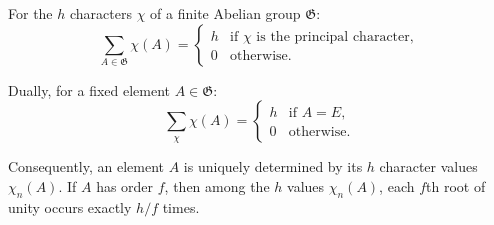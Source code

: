 For the $h$ characters $\chi$ of a finite Abelian group $\mathfrak{G}$:
$$\sum_{A \in \mathfrak{G}} \chi(A) = \begin{cases} h & \text{if } \chi \text{ is the principal character}, \\ 0 & \text{otherwise}. \end{cases}$$

Dually, for a fixed element $A \in \mathfrak{G}$:
$$\sum_{\chi} \chi(A) = \begin{cases} h & \text{if } A = E, \\ 0 & \text{otherwise}. \end{cases}$$

Consequently, an element $A$ is uniquely determined by its $h$ character values $\chi_n(A)$. If $A$ has order $f$, then among the $h$ values $\chi_n(A)$, each $f$th root of unity occurs exactly $h/f$ times.
